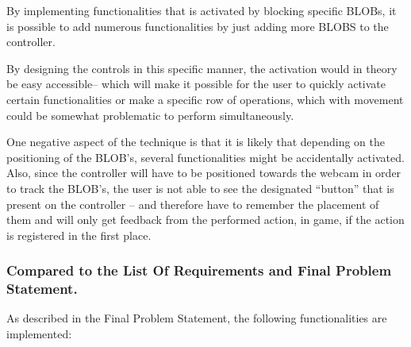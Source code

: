 By implementing functionalities that is activated by blocking specific BLOBs, it is possible to add numerous functionalities by just adding more BLOBS to the controller. 

By designing the controls in this specific manner, the activation would in theory be easy accessible– which will make it possible for the user to quickly activate certain functionalities or make a specific row of operations, which with movement could be somewhat problematic to perform simultaneously. 

One negative aspect of the technique is that it is likely that depending on the positioning of the BLOB’s, several functionalities might be accidentally activated. Also, since the controller will have to be positioned towards the webcam in order to track the BLOB’s, the user is not able to see the designated “button” that is present on the controller – and therefore have to remember the placement of them and will only get feedback from the performed action, in game, if the action is registered in the first place.

\subsubsection*{Compared to the List Of Requirements and Final Problem Statement.}
As described in the Final Problem Statement, the following functionalities are implemented:

